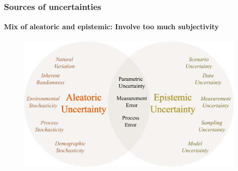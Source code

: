 \begin{frame}
\frametitle{Sources of uncertainties}
\framesubtitle{Mix of aleatoric and epistemic: Involve too much subjectivity}
\begin{figure}
\includegraphics[scale=0.3]{figures/figure-uncertainty_classification.pdf}
\end{figure}
\end{frame}

